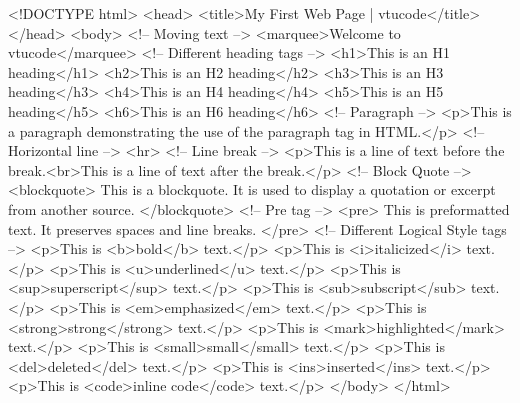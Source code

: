 <!DOCTYPE html>
<head>
    <title>My First Web Page | vtucode</title>
</head>
<body>
    <!-- Moving text -->
    <marquee>Welcome to vtucode</marquee>
    <!-- Different heading tags -->
    <h1>This is an H1 heading</h1>
    <h2>This is an H2 heading</h2>
    <h3>This is an H3 heading</h3>
    <h4>This is an H4 heading</h4>
    <h5>This is an H5 heading</h5>
    <h6>This is an H6 heading</h6>
    <!-- Paragraph -->
    <p>This is a paragraph demonstrating the use of the paragraph tag in HTML.</p>
    <!-- Horizontal line -->
    <hr>
    <!-- Line break -->
    <p>This is a line of text before the break.<br>This is a line of text after the break.</p>
    <!-- Block Quote -->
    <blockquote>
        This is a blockquote. It is used to display a quotation or excerpt from another source.
    </blockquote>
    <!-- Pre tag -->
    <pre>
This is preformatted text.
It preserves spaces and line breaks.
    </pre>
    <!-- Different Logical Style tags -->
    <p>This is <b>bold</b> text.</p>
    <p>This is <i>italicized</i> text.</p>
    <p>This is <u>underlined</u> text.</p>
    <p>This is <sup>superscript</sup> text.</p>
    <p>This is <sub>subscript</sub> text.</p>
    <p>This is <em>emphasized</em> text.</p>
    <p>This is <strong>strong</strong> text.</p>
    <p>This is <mark>highlighted</mark> text.</p>
    <p>This is <small>small</small> text.</p>
    <p>This is <del>deleted</del> text.</p>
    <p>This is <ins>inserted</ins> text.</p>
    <p>This is <code>inline code</code> text.</p>
</body>
</html>

